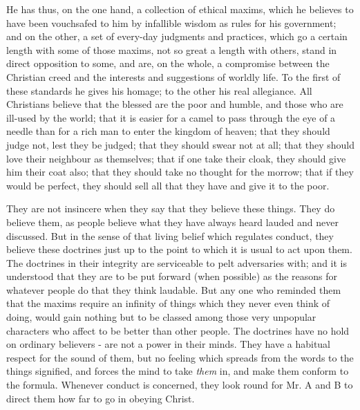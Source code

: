 He has thus, on the one hand, a collection of ethical maxims, which he believes to have been vouchsafed to him by infallible wisdom as rules for his government; and on the other, a set of every-day judgments and practices, which go a certain length with some of those maxims, not so great a length with others, stand in direct opposition to some, and are, on the whole, a compromise between the Christian creed and the interests and suggestions of worldly life. To the first of these standards he gives his homage; to the other his real allegiance. All Christians believe that the blessed are the poor and humble, and those who are ill-used by the world; that it is easier for a camel to pass through the eye of a needle than for a rich man to enter the kingdom of heaven; that they should judge not, lest they be judged; that they should swear not at all; that they should love their neighbour as themselves; that if one take their cloak, they should give him their coat also; that they should take no thought for the morrow; that if they would be perfect, they should sell all that they have and give it to the poor.\par

They are not insincere when they say that they believe these things. They do believe them, as people believe what they have always heard lauded and never discussed. But in the sense of that living belief which regulates conduct, they believe these doctrines just up to the point to which it is usual to act upon them. The doctrines in their integrity are serviceable to pelt adversaries with; and it is understood that they are to be put forward (when possible) as the reasons for whatever people do that they think laudable. But any one who reminded them that the maxims require an infinity of things which they never even think of doing, would gain nothing but to be classed among those very unpopular characters who affect to be better than other people. The doctrines have no hold on ordinary believers - are not a power in their minds. They have a habitual respect for the sound of them, but no feeling which spreads from the words to the things signified, and forces the mind to take \textit{them} in, and make them conform to the formula. Whenever conduct is concerned, they look round for Mr. A and B to direct them how far to go in obeying Christ.\par

